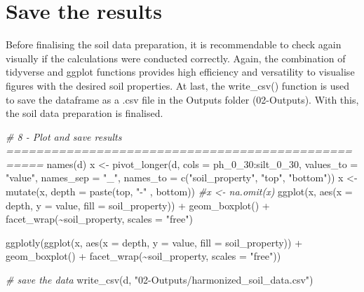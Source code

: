 \documentclass[
  10pt,
  b5paper,
  oneside]{book}
\newenvironment{Shaded}{\begin{snugshade}}{\end{snugshade}}
\newcommand{\AttributeTok}[1]{\textcolor[rgb]{0.77,0.63,0.00}{#1}}
\newcommand{\CommentTok}[1]{\textcolor[rgb]{0.56,0.35,0.01}{\textit{#1}}}
\newcommand{\FunctionTok}[1]{\textcolor[rgb]{0.00,0.00,0.00}{#1}}
\newcommand{\NormalTok}[1]{#1}
\newcommand{\OtherTok}[1]{\textcolor[rgb]{0.56,0.35,0.01}{#1}}
\newcommand{\SpecialCharTok}[1]{\textcolor[rgb]{0.00,0.00,0.00}{#1}}
\newcommand{\StringTok}[1]{\textcolor[rgb]{0.31,0.60,0.02}{#1}}
\begin{document}
\hypertarget{save-the-results}{%
\section{Save the results}\label{save-the-results}}

Before finalising the soil data preparation, it is recommendable to check again visually if the calculations were conducted correctly. Again, the combination of tidyverse and ggplot functions provides high efficiency and versatility to visualise figures with the desired soil properties. At last, the write\_csv() function is used to save the dataframe as a .csv file in the Outputs folder (02-Outputs). With this, the soil data preparation is finalised.

\begin{Shaded}
\begin{Highlighting}[]
\CommentTok{\# 8 {-} Plot  and save results ===================================================}
\FunctionTok{names}\NormalTok{(d)}
\NormalTok{x }\OtherTok{\textless{}{-}} \FunctionTok{pivot\_longer}\NormalTok{(d, }\AttributeTok{cols =}\NormalTok{ ph\_0\_30}\SpecialCharTok{:}\NormalTok{silt\_0\_30, }\AttributeTok{values\_to =} \StringTok{"value"}\NormalTok{,}
                  \AttributeTok{names\_sep =} \StringTok{"\_"}\NormalTok{, }
                  \AttributeTok{names\_to =} \FunctionTok{c}\NormalTok{(}\StringTok{"soil\_property"}\NormalTok{, }\StringTok{"top"}\NormalTok{, }\StringTok{"bottom"}\NormalTok{))}
\NormalTok{x }\OtherTok{\textless{}{-}} \FunctionTok{mutate}\NormalTok{(x, }\AttributeTok{depth =} \FunctionTok{paste}\NormalTok{(top, }\StringTok{"{-}"}\NormalTok{ , bottom))}
\CommentTok{\#x \textless{}{-} na.omit(x)}
\FunctionTok{ggplot}\NormalTok{(x, }\FunctionTok{aes}\NormalTok{(}\AttributeTok{x =}\NormalTok{ depth, }\AttributeTok{y =}\NormalTok{ value, }\AttributeTok{fill =}\NormalTok{ soil\_property)) }\SpecialCharTok{+}
  \FunctionTok{geom\_boxplot}\NormalTok{() }\SpecialCharTok{+} 
  \FunctionTok{facet\_wrap}\NormalTok{(}\SpecialCharTok{\textasciitilde{}}\NormalTok{soil\_property, }\AttributeTok{scales =} \StringTok{"free"}\NormalTok{)}


\FunctionTok{ggplotly}\NormalTok{(}\FunctionTok{ggplot}\NormalTok{(x, }\FunctionTok{aes}\NormalTok{(}\AttributeTok{x =}\NormalTok{ depth, }\AttributeTok{y =}\NormalTok{ value, }\AttributeTok{fill =}\NormalTok{ soil\_property)) }\SpecialCharTok{+}
           \FunctionTok{geom\_boxplot}\NormalTok{() }\SpecialCharTok{+} 
           \FunctionTok{facet\_wrap}\NormalTok{(}\SpecialCharTok{\textasciitilde{}}\NormalTok{soil\_property, }\AttributeTok{scales =} \StringTok{"free"}\NormalTok{))}

\CommentTok{\# save the data}
\FunctionTok{write\_csv}\NormalTok{(d, }\StringTok{"02{-}Outputs/harmonized\_soil\_data.csv"}\NormalTok{)}
\end{Highlighting}
\end{Shaded}
\end{document}
